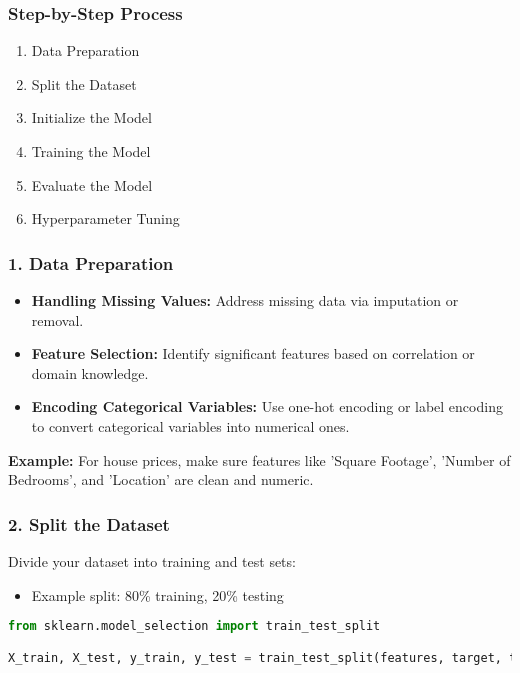 \documentclass[aspectratio=169]{beamer}
\begin{document}
\begin{frame}
    \frametitle{Step-by-Step Process}
    \begin{enumerate}
        \item Data Preparation
        \item Split the Dataset
        \item Initialize the Model
        \item Training the Model
        \item Evaluate the Model
        \item Hyperparameter Tuning
    \end{enumerate}
\end{frame}

\begin{frame}
    \frametitle{1. Data Preparation}
    \begin{itemize}
        \item \textbf{Handling Missing Values:} Address missing data via imputation or removal.
        \item \textbf{Feature Selection:} Identify significant features based on correlation or domain knowledge.
        \item \textbf{Encoding Categorical Variables:} Use one-hot encoding or label encoding to convert categorical variables into numerical ones.
    \end{itemize}
    \textbf{Example:} For house prices, make sure features like 'Square Footage', 'Number of Bedrooms', and 'Location' are clean and numeric.
\end{frame}

\begin{frame}[fragile]
    \frametitle{2. Split the Dataset}
    Divide your dataset into training and test sets:
    \begin{itemize}
        \item Example split: 80\% training, 20\% testing
    \end{itemize}
    \begin{lstlisting}[language=Python]
from sklearn.model_selection import train_test_split

X_train, X_test, y_train, y_test = train_test_split(features, target, test_size=0.2, random_state=42)
    \end{lstlisting}
\end{frame}
\end{document}
